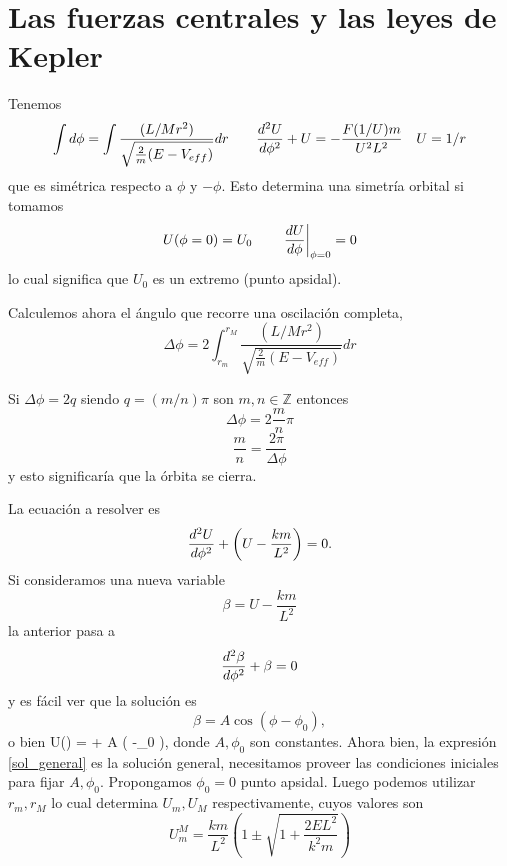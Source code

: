 \documentclass[10pt,oneside]{CBFT_book}
\begin{document}
\section{Las fuerzas centrales y las leyes de Kepler}

Tenemos 
\[
	\int d\phi = \int \frac{(L/Mr^2)}{\sqrt{ \frac{2}{m}(E - V_{eff})}} dr	\qquad
	\dtot[2]{U}{\phi} + U  = - \frac{F(1/U) m}{U^2 L^2} \quad U = 1/r
\]
que es simétrica respecto a $\phi$ y $-\phi$. Esto determina una simetría orbital si
tomamos
\[
	U(\phi=0) = U_0 	\qquad		\left. \dtot{U}{\phi} \right|_{\phi=0}= 0
\]
lo cual significa que $U_0$ es un extremo (punto apsidal).

Calculemos ahora el ángulo que recorre una oscilación completa,
\[
	\Delta \phi = 2\int_{r_m}^{r_M} \frac{(L/Mr^2)}{\sqrt{ \frac{2}{m}(E - V_{eff})}} dr
\]

Si $\Delta \phi = 2 q $ siendo $q= (m/n)\pi $ son $m,n \in \mathbb{Z}$ entonces
\[
	\Delta \phi = 2 \frac{m}{n} \pi 
\]
\[
	\frac{m}{n} = \frac{2\pi}{\Delta \phi}
\]
y esto significaría que la órbita se cierra.

La ecuación a resolver es 
\[
	\dtot[2]{U}{\phi} + \left( U  - \frac{k m}{L^2} \right) = 0.
\]
Si consideramos una nueva variable 
\[
	\beta = U  - \frac{k m}{L^2}
\]
la anterior pasa a 
\[
	\dtot[2]{\beta}{\phi} + \beta = 0
\]
y es fácil ver que la solución es
\[
	\beta = A \cos( \phi -\phi_0 ),
\]
o bien 
\be
	U(\phi) =  +  A \cos( \phi -\phi_0 ),
	\label{sol_general}
\ee
donde $A,\phi_0$ son constantes. Ahora bien, la expresión \eqref{sol_general} es la solución general,
necesitamos proveer las condiciones iniciales para fijar $ A, \phi_0 $. Propongamos $ \phi_0 = 0 $
punto apsidal.
Luego podemos utilizar $r_m, r_M$ lo cual determina $U_m, U_M$ respectivamente, cuyos valores son 
\[
	U^M_m = \frac{km}{L^2} \left( 1 \pm \sqrt{1 + \frac{2EL^2}{k^2 m} }\right)
\]
\end{document}
